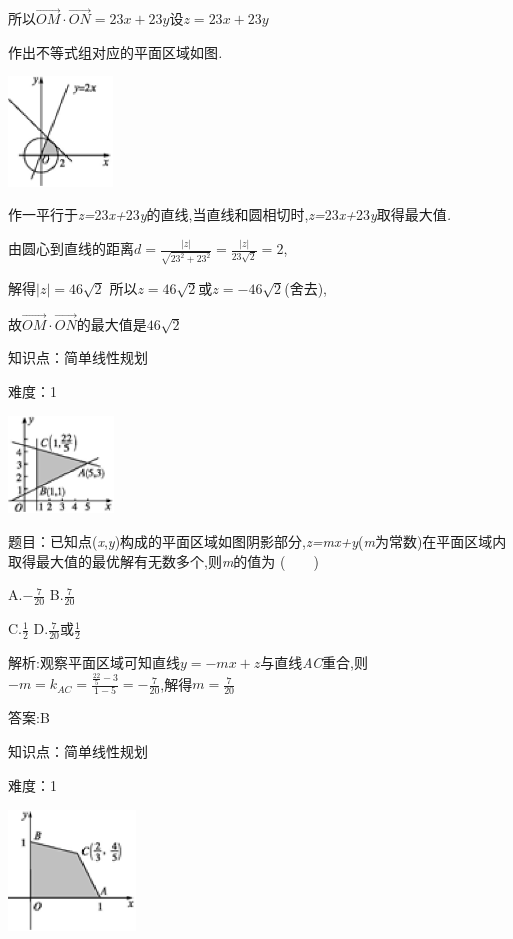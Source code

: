 \documentclass{article} %
\begin{document}
所以$\vec{OM}\cdot\vec{ON}=23x+23y$设$z=23x+23y$

作出不等式组对应的平面区域如图\textit{.}

 \includegraphics*[width=1.10in, height=1.15in, keepaspectratio=false]{image1686}

作一平行于\textit{z=}23\textit{x+}23\textit{y}的直线,当直线和圆相切时,\textit{z=}23\textit{x+}23\textit{y}取得最大值\textit{.}

由圆心到直线的距离$d=\frac{|z|}{\sqrt{23^2+23^2}}=\frac{|z|}{23\sqrt{2}}=2$,

解得$|z|=46\sqrt{2}$
所以$z=46\sqrt{2}$或$z=-46\sqrt{2}$(舍去),

故$\vec{OM}\cdot\vec{ON}$的最大值是$46\sqrt{2}$


知识点：简单线性规划

难度：1


 \includegraphics*[width=1.10in, height=1.02in, keepaspectratio=false]{image1693}

 题目：已知点(\textit{x},\textit{y})构成的平面区域如图阴影部分,\textit{z=mx+y}(\textit{m}为常数)在平面区域内取得最大值的最优解有无数多个,则\textit{m}的值为 (\textit{　　})

 A.$-\frac{7}{20}$ B.$\frac{7}{20}$

 C.$\frac{1}{2}$ D.$\frac{7}{20}$或$\frac{1}{2}$


解析:观察平面区域可知直线$y=-mx+z$与直线\textit{AC}重合,则$-m=k_{AC}=\frac{\frac{22}{5}-3}{1-5}=-\frac{7}{20}$,解得$m=\frac{7}{20}$

 答案:B

知识点：简单线性规划

难度：1

 \includegraphics*[width=1.33in, height=1.27in, keepaspectratio=false]{image1701}
\end{document}
